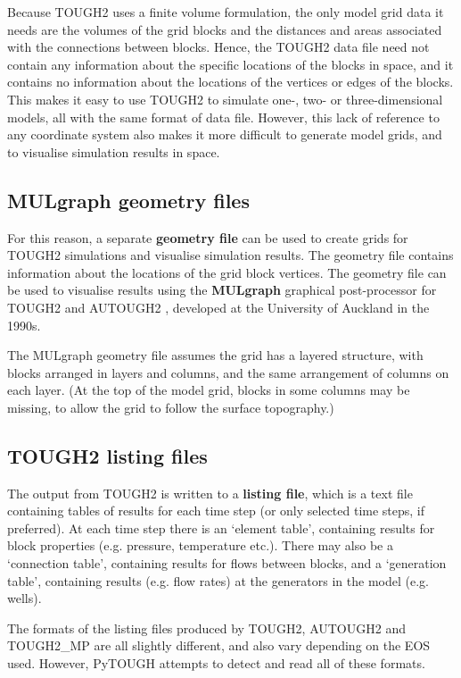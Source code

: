 Because TOUGH2 uses a finite volume formulation, the only model grid data it needs are the volumes of the grid blocks and the distances and areas associated with the connections between blocks.  Hence, the TOUGH2 data file need not contain any information about the specific locations of the blocks in space, and it contains no information about the locations of the vertices or edges of the blocks.  This makes it easy to use TOUGH2 to simulate one-, two- or three-dimensional models, all with the same format of data file.  However, this lack of reference to any coordinate system also makes it more difficult to generate model grids, and to visualise simulation results in space.

\subsection{MULgraph geometry files}

For this reason, a separate \textbf{geometry file} can be used to create grids for TOUGH2 simulations and visualise simulation results.  The geometry file contains information about the locations of the grid block vertices.  The geometry file can be used to visualise results using the \textbf{MULgraph} graphical post-processor for TOUGH2 and AUTOUGH2 \citep{mulgraph}, developed at the University of Auckland in the 1990s.

The MULgraph geometry file assumes the grid has a layered structure, with blocks arranged in layers and columns, and the same arrangement of columns on each layer.  (At the top of the model grid, blocks in some columns may be missing, to allow the grid to follow the surface topography.)

\subsection{TOUGH2 listing files}

The output from TOUGH2 is written to a \textbf{listing file}, which is a text file containing tables of results for each time step (or only selected time steps, if preferred).  At each time step there is an `element table', containing results for block properties (e.g. pressure, temperature etc.).  There may also be a `connection table', containing results for flows between blocks, and a `generation table', containing results (e.g. flow rates) at the generators in the model (e.g. wells).

The formats of the listing files produced by TOUGH2, AUTOUGH2 and TOUGH2\_MP are all slightly different, and also vary depending on the EOS used.  However, PyTOUGH attempts to detect and read all of these formats.

